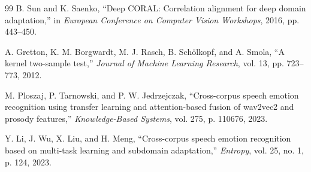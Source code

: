﻿\documentclass[10pt,twocolumn,letterpaper]{article}
\begin{document}
\begin{thebibliography}{99}
B. Sun and K. Saenko,
``Deep CORAL: Correlation alignment for deep domain adaptation,''
in \textit{European Conference on Computer Vision Workshops}, 2016, pp. 443--450.

A. Gretton, K. M. Borgwardt, M. J. Rasch, B. Sch\"olkopf, and A. Smola,
``A kernel two-sample test,''
\textit{Journal of Machine Learning Research}, vol. 13, pp. 723--773, 2012.

M. Ploszaj, P. Tarnowski, and P. W. Jedrzejczak,
``Cross-corpus speech emotion recognition using transfer learning and attention-based fusion of wav2vec2 and prosody features,''
\textit{Knowledge-Based Systems}, vol. 275, p. 110676, 2023.

Y. Li, J. Wu, X. Liu, and H. Meng,
``Cross-corpus speech emotion recognition based on multi-task learning and subdomain adaptation,''
\textit{Entropy}, vol. 25, no. 1, p. 124, 2023.

\end{thebibliography}
\end{document}
